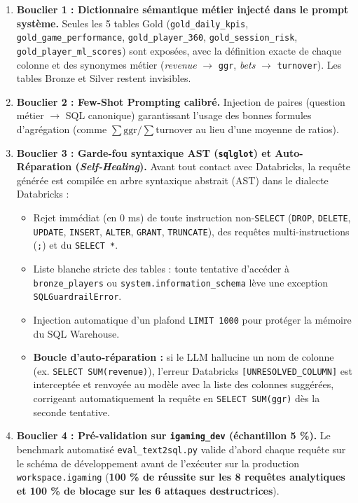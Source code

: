 \documentclass[11pt,a4paper]{article}
\begin{document}
\begin{enumerate}
    \item \textbf{Bouclier 1 : Dictionnaire sémantique métier injecté dans le prompt système.} Seules les 5 tables Gold (\texttt{gold\_daily\_kpis}, \texttt{gold\_game\_performance}, \texttt{gold\_player\_360}, \texttt{gold\_session\_risk}, \texttt{gold\_player\_ml\_scores}) sont exposées, avec la définition exacte de chaque colonne et des synonymes métier (\textit{revenue} $\rightarrow$ \texttt{ggr}, \textit{bets} $\rightarrow$ \texttt{turnover}). Les tables Bronze et Silver restent invisibles.
    \item \textbf{Bouclier 2 : Few-Shot Prompting calibré.} Injection de paires (question métier $\rightarrow$ SQL canonique) garantissant l'usage des bonnes formules d'agrégation (comme $\sum \text{ggr} / \sum \text{turnover}$ au lieu d'une moyenne de ratios).
    \item \textbf{Bouclier 3 : Garde-fou syntaxique AST (\texttt{sqlglot}) et Auto-Réparation (\textit{Self-Healing}).} Avant tout contact avec Databricks, la requête générée est compilée en arbre syntaxique abstrait (AST) dans le dialecte Databricks :
    \begin{itemize}
        \item Rejet immédiat (en 0 ms) de toute instruction non-\texttt{SELECT} (\texttt{DROP}, \texttt{DELETE}, \texttt{UPDATE}, \texttt{INSERT}, \texttt{ALTER}, \texttt{GRANT}, \texttt{TRUNCATE}), des requêtes multi-instructions (\texttt{;}) et du \texttt{SELECT *}.
        \item Liste blanche stricte des tables : toute tentative d'accéder à \texttt{bronze\_players} ou \texttt{system.information\_schema} lève une exception \texttt{SQLGuardrailError}.
        \item Injection automatique d'un plafond \texttt{LIMIT 1000} pour protéger la mémoire du SQL Warehouse.
        \item \textbf{Boucle d'auto-réparation :} si le LLM hallucine un nom de colonne (ex. \texttt{SELECT SUM(revenue)}), l'erreur Databricks \texttt{[UNRESOLVED\_COLUMN]} est interceptée et renvoyée au modèle avec la liste des colonnes suggérées, corrigeant automatiquement la requête en \texttt{SELECT SUM(ggr)} dès la seconde tentative.
    \end{itemize}
    \item \textbf{Bouclier 4 : Pré-validation sur \texttt{igaming\_dev} (échantillon 5 \%).} Le benchmark automatisé \texttt{eval\_text2sql.py} valide d'abord chaque requête sur le schéma de développement avant de l'exécuter sur la production \texttt{workspace.igaming} (\textbf{100 \% de réussite sur les 8 requêtes analytiques et 100 \% de blocage sur les 6 attaques destructrices}).
\end{enumerate}
\end{document}
